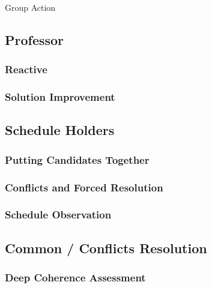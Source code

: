 \documentclass{beamer}
\providecommand{\rootdir}{../doc}
\begin{document}
\begin{frame}{Group Action}
\end{frame}



\subsection{Professor}
\subsubsection{Reactive}
\subsubsection{Solution Improvement}

\subsection{Schedule Holders}
\subsubsection{Putting Candidates Together}
\subsubsection{Conflicts and Forced Resolution}
\subsubsection{Schedule Observation}

\subsection{Common / Conflicts Resolution}
\subsubsection{Deep Coherence Assessment}
\end{document}
